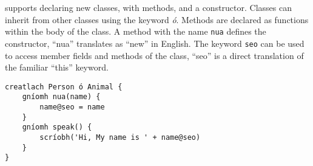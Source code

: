     \Setanta{} supports declaring new classes, with methods, and a constructor.  Classes can inherit from other classes using the keyword \emph{ó}. Methods are declared as functions within the body of the class.
    A method with the name \verb|nua| defines the constructor, ``nua'' translates as ``new'' in English.
    The keyword \lstinline[language=setanta]|seo| can be used to access member fields and methods of the class, ``seo'' is a direct translation of the familiar ``this'' keyword.
    \begin{lstlisting}[language=setanta, frame=single, caption=Setanta classe example]
creatlach Person ó Animal {
    gníomh nua(name) {
        name@seo = name
    }
    gníomh speak() {
        scríobh('Hi, My name is ' + name@seo)
    }
}
    \end{lstlisting}
